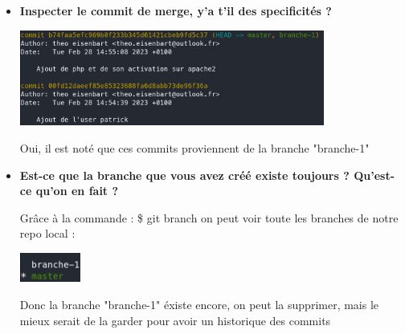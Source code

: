 \documentclass[12pt]{article}
\begin{document}
\begin{itemize}
  \item \textbf{Inspecter le commit de merge, y'a t'il des specificités ?}
  \vspace{0.3cm}

  \includegraphics[width=10cm]{images/screen-git-td2-11.png}
  \vspace{0.3cm}

  Oui, il est noté que ces commits proviennent de la branche "branche-1"
\end{itemize}
\vspace{0.3cm}

\begin{itemize}
  \item \textbf{Est-ce que la branche que vous avez créé existe toujours ? Qu'est-ce qu'on en fait ?}
  \vspace{0.3cm}

  Grâce à la commande : \newline
  \$ git branch \newline
  on peut voir toute les branches de notre repo local :
  \vspace{0.3cm}

  \includegraphics[width=2cm]{images/screen-git-td2-12.png}
  \vspace{0.3cm}

  Donc la branche "branche-1" éxiste encore, on peut la supprimer, mais le mieux serait de la garder pour avoir un
  historique des commits
\end{itemize}
\end{document}
